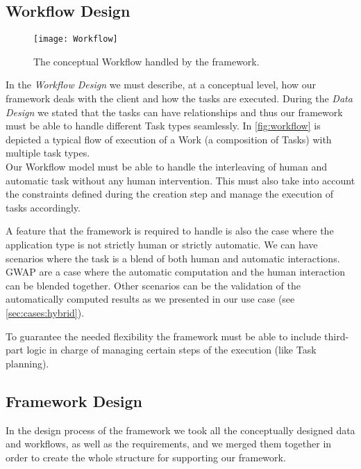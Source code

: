 \subsection{Workflow Design}\label{design:work}
\begin{figure}[htb]
    \centering
    \texttt{[image: Workflow]}
    \caption{The conceptual Workflow handled by the framework.}
    \label{fig:workflow}
\end{figure}

In the \emph{Workflow Design} we must describe, at a conceptual level, how our
framework deals with the client and how the tasks are executed. During the
\emph{Data Design} we stated that the tasks can have relationships and thus our
framework must be able to handle different Task types seamlessly. In
\autoref{fig:workflow} is depicted a typical flow of execution of a Work (a
composition of Tasks) with multiple task types.\\

Our Workflow model must be able to handle the interleaving of human and automatic
task without any human intervention. This must also take into account the
constraints defined during the creation step and manage the execution of
tasks accordingly.

A feature that the framework is required to handle is also the case where
the application type is not strictly human or strictly automatic. We can have
scenarios where the task is a blend of both human and automatic interactions.
\ac{GWAP} are a case where the automatic computation and the human interaction
can be blended together. Other scenarios can be the validation of the automatically
computed results as we presented in our use case (see \ref{sec:cases:hybrid}).

To guarantee the needed flexibility the framework must be able to include third-part
logic in charge of managing certain steps of the execution (like Task planning).




\subsection{Framework Design}
In the design process of the framework we took all the conceptually designed data
and workflows, as well as the requirements, and we merged them together in order
to create the whole structure for supporting our framework.\\

